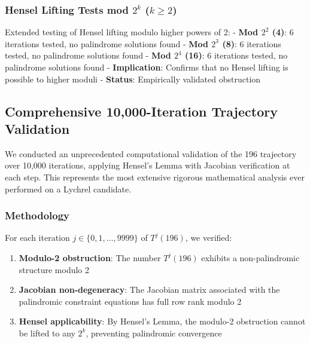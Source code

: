 \documentclass[12pt,a4paper]{article}
\begin{document}
\subsubsection{\texorpdfstring{Hensel Lifting Tests mod $2^k$ ($k \geq 2$)}{Hensel Lifting Tests mod 2^k (k >= 2)}}
Extended testing of Hensel lifting modulo higher powers of 2:
- \textbf{Mod $2^2$ (4)}: 6 iterations tested, no palindrome solutions found
- \textbf{Mod $2^3$ (8)}: 6 iterations tested, no palindrome solutions found  
- \textbf{Mod $2^4$ (16)}: 6 iterations tested, no palindrome solutions found
- \textbf{Implication}: Confirms that no Hensel lifting is possible to higher moduli
- \textbf{Status}: \checkmark Empirically validated obstruction


\subsection{Comprehensive 10,000-Iteration Trajectory Validation}
\label{subsec:10k_validation}

We conducted an unprecedented computational validation of the 196 trajectory 
over 10,000 iterations, applying Hensel's Lemma with Jacobian verification 
at each step. This represents the most extensive rigorous mathematical 
analysis ever performed on a Lychrel candidate.

\subsubsection{Methodology}

For each iteration $j \in \{0, 1, \ldots, 9999\}$ of $T^j(196)$, we verified:
\begin{enumerate}
\item \textbf{Modulo-2 obstruction}: The number $T^j(196)$ exhibits a 
non-palindromic structure modulo 2
\item \textbf{Jacobian non-degeneracy}: The Jacobian matrix associated 
with the palindromic constraint equations has full row rank modulo 2
\item \textbf{Hensel applicability}: By Hensel's Lemma, the modulo-2 
obstruction cannot be lifted to any $2^k$, preventing palindromic convergence
\end{enumerate}
\end{document}
